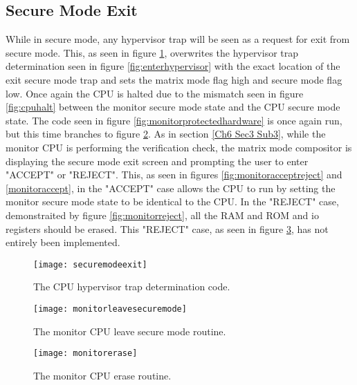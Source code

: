
\subsection{Secure Mode Exit}

\label{Ch6 Sec3 Sub4}

While in secure mode, any hypervisor trap will be seen as a request for exit from secure mode. This, as seen in figure \ref{fig:securemodeexit}, overwrites the hypervisor trap determination seen in figure \ref{fig:enterhypervisor} with the exact location of the exit secure mode trap and sets the matrix mode flag high and secure mode flag low. Once again the CPU is halted due to the mismatch seen in figure \ref{fig:cpuhalt} between the monitor secure mode state and the CPU secure mode state. The code seen in figure \ref{fig:monitorprotectedhardware} is once again run, but this time branches to figure \ref{fig:monitorleavesecuremode}. As in section \ref{Ch6 Sec3 Sub3}, while the monitor CPU is performing the verification check, the matrix mode compositor is displaying the secure mode exit screen and prompting the user to enter "ACCEPT" or "REJECT". This, as seen in figures \ref{fig:monitoracceptreject} and \ref{monitoraccept}, in the "ACCEPT" case allows the CPU to run by setting the monitor secure mode state to be identical to the CPU. In the "REJECT" case, demonstraited by figure \ref{fig:monitorreject},  all the RAM and ROM and io registers should be erased. This "REJECT" case, as seen in figure \ref{fig:monitorerase}, has not entirely been implemented.

\begin{figure}
  \centering
  \texttt{[image: securemodeexit]}
  \caption{The CPU hypervisor trap determination code.}
  \label{fig:securemodeexit}
\end{figure}

\begin{figure}
  \centering
  \texttt{[image: monitorleavesecuremode]}
  \caption{The monitor CPU leave secure mode routine.}
  \label{fig:monitorleavesecuremode}
\end{figure}

\begin{figure}
  \centering
  \texttt{[image: monitorerase]}
  \caption{The monitor CPU erase routine.}
  \label{fig:monitorerase}
\end{figure}


